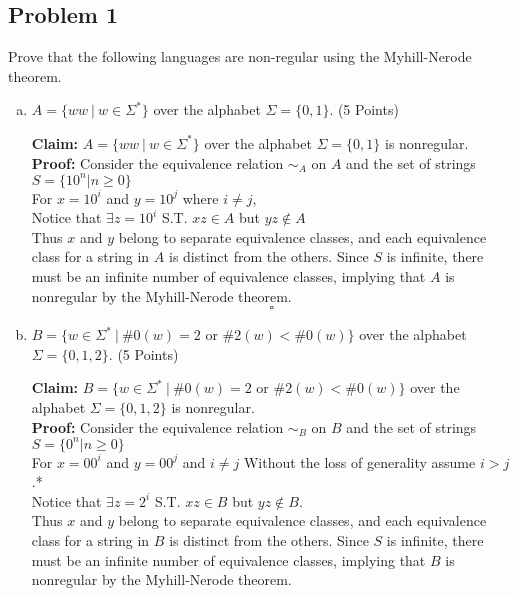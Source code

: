 \documentclass{article}
\begin{document}
\subsection*{Problem 1}
Prove that the following languages are non-regular using the Myhill-Nerode theorem.
\begin{enumerate}[(a)]

\item $A = \{ww\ |\ w \in \Sigma^*\}$ over the alphabet $\Sigma = \{0,1\}$. (5 Points)

\textbf{Claim:}
    $A = \{ww\ |\ w \in \Sigma^*\}$ over the alphabet $\Sigma = \{0,1\}$ is nonregular.\\
\textbf{Proof:}
    Consider the equivalence relation $\sim_A$ on $A$ and the set of strings \\
    $S = \{10^n | n \geq 0 \}$ \\
    For $x = 10^i$ and $y = 10^j$ where $i \neq j$, \\
    Notice that $\exists z = 10^i$ S.T. $xz \in A$ but
    $yz \notin A$ \\
    Thus $x$ and $y$ belong to separate equivalence classes,
    and each equivalence class for a string in
    $A$ is distinct from the others. Since $S$ is infinite, there must be an infinite number of
    equivalence classes, implying that $A$ is nonregular by the Myhill-Nerode theorem.
    \[ \square \]

\item $B = \{w \in \Sigma^*\ |\ \#0(w) = 2 $ or $ \#2(w) < \#0(w)\}$ over the alphabet
    $\Sigma = \{0,1,2\}$. (5 Points)

\textbf{Claim:}
    $B = \{w \in \Sigma^*\ |\ \#0(w) = 2 $ or $ \#2(w) < \#0(w)\}$ over the alphabet
    $\Sigma = \{0,1,2\}$ is nonregular.\\
\textbf{Proof:}
    Consider the equivalence relation $\sim_B$ on $B$ and the set of strings \\
    $S = \{0^n | n \geq 0 \}$ \\
    For $x = 00^i$ and $y = 00^j$ and $i \neq j$ Without the loss of generality assume
    $i > j$.*\\
    Notice that $\exists z=2^i$ S.T. $xz \in B$ but $yz \notin B$. \\
    Thus $x$ and $y$ belong to separate equivalence classes,
    and each equivalence class for a string in
    $B$ is distinct from the others. Since $S$ is infinite, there must be an infinite number of
    equivalence classes, implying that $B$ is nonregular by the Myhill-Nerode theorem.


\end{enumerate}
\end{document}
